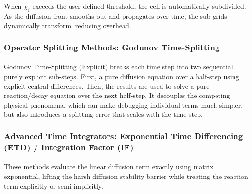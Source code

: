 When $\chi_i$ exceeds the user-defined threshold, the cell is automatically subdivided. As the diffusion front smooths out and propagates over time, the sub-grids dynamically transform, reducing overhead.

\subsubsection*{Operator Splitting Methods: Godunov Time-Splitting}
\paragraph{}
Godunov Time-Splitting (Explicit) breaks each time step into two sequential, purely explicit sub-steps. First, a pure diffusion equation over a half-step using explicit central differences.  Then, the results are used to solve a pure reaction/decay equation over the next half-step. It decouples the competing physical phenomena, which can make debugging individual terms much simpler, but also introduces a splitting error that scales with the time step. 

\subsubsection*{Advanced Time Integrators: Exponential Time Differencing (ETD) / Integration Factor (IF)}
\paragraph{}
These methods evaluate the linear diffusion term exactly using matrix exponential, lifting the harsh diffusion stability barrier while treating the reaction term explicitly or semi-implicitly.


